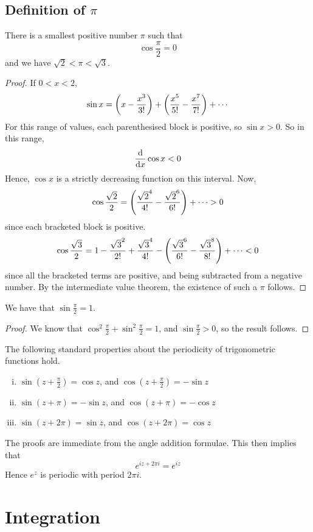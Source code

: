 \documentclass{article}
\begin{document}
\subsection{Definition of $\pi$}
\begin{proposition}
	There is a smallest positive number $\pi$ such that
	\[ \cos \frac{\pi}{2} = 0 \]
	and we have $\sqrt{2} < \pi < \sqrt{3}$.
\end{proposition}
\begin{proof}
	If $0 < x < 2$,
	\[ \sin x = \qty(x - \frac{x^3}{3!}) + \qty(\frac{x^5}{5!} - \frac{x^7}{7!}) + \cdots \]
	For this range of values, each parenthesised block is positive, so $\sin x > 0$. So in this range,
	\[ \dv{x} \cos x < 0 \]
	Hence, $\cos x$ is a strictly decreasing function on this interval. Now,
	\[ \cos \frac{\sqrt{2}}{2} = \qty(\frac{\sqrt{2}^4}{4!} - \frac{\sqrt{2}^6}{6!}) + \cdots > 0 \]
	since each bracketed block is positive.
	\[ \cos \frac{\sqrt{3}}{2} = 1 - \frac{\sqrt{3}^2}{2!} + \frac{\sqrt{3}^4}{4!} - \qty(\frac{\sqrt{3}^6}{6!} - \frac{\sqrt{3}^8}{8!}) + \cdots < 0 \]
	since all the bracketed terms are positive, and being subtracted from a negative number. By the intermediate value theorem, the existence of such a $\pi$ follows.
\end{proof}
\begin{corollary}
	We have that $\sin \frac{\pi}{2} = 1$.
\end{corollary}
\begin{proof}
	We know that $\cos^2 \frac{\pi}{2} + \sin^2 \frac{\pi}{2} = 1$, and $\sin \frac{\pi}{2} > 0$, so the result follows.
\end{proof}
\begin{theorem}
	The following standard properties about the periodicity of trigonometric functions hold.
	\begin{enumerate}[(i)]
		\item $\sin(z + \frac{\pi}{2}) = \cos z$, and $\cos(z + \frac{\pi}{2}) = -\sin z$
		\item $\sin(z + \pi) = -\sin z$, and $\cos(z + \pi) = -\cos z$
		\item $\sin(z + 2 \pi) = \sin z$, and $\cos(z + 2\pi) = \cos z$
	\end{enumerate}
\end{theorem}
\noindent The proofs are immediate from the angle addition formulae. This then implies that
\[ e^{iz + 2\pi i} = e^{iz} \]
Hence $e^{z}$ is periodic with period $2 \pi i$.

\section{Integration}
\end{document}
